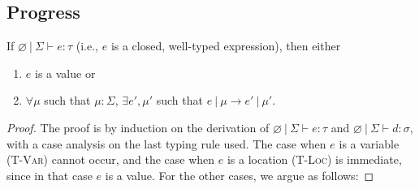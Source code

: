 \documentclass{llncs}
\begin{document}
\subsection{Progress}

\begin{theorem}[Progress]
If $\varnothing~|~\Sigma \vdash e : \tau$ (i.e., $e$ is a closed, well-typed expression), then either
\begin{enumerate}
\item $e$ is a value or
\item $\forall \mu$ such that $\mu : \Sigma$,
   $\exists e', \mu'$ such that $e~|~\mu \longrightarrow e'~|~\mu'$.
\end{enumerate}
\end{theorem}
\begin{proof} The proof is by induction on the derivation of $\varnothing~|~\Sigma \vdash e : \tau$ and $\varnothing~|~\Sigma \vdash d : \sigma$, with a case analysis on the last typing rule used. The case when $e$ is a variable (\textsc{T-Var}) cannot occur, and the case when $e$ is a location (\textsc{T-Loc}) is immediate, since in that case $e$ is a value. For the other cases, we argue as follows:


\end{proof}
\end{document}
